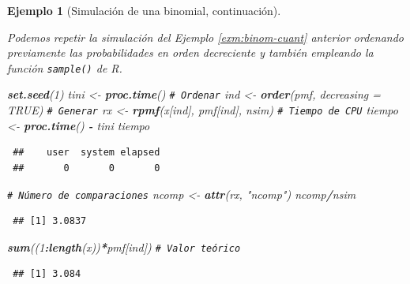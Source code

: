 \documentclass[
  spanish,
  10pt,
]{book}
\newenvironment{Shaded}{\begin{snugshade}}{\end{snugshade}}
\newcommand{\AttributeTok}[1]{\textcolor[rgb]{0.13,0.29,0.53}{#1}}
\newcommand{\CommentTok}[1]{\textcolor[rgb]{0.56,0.35,0.01}{\textit{#1}}}
\newcommand{\ConstantTok}[1]{\textcolor[rgb]{0.56,0.35,0.01}{#1}}
\newcommand{\DecValTok}[1]{\textcolor[rgb]{0.00,0.00,0.81}{#1}}
\newcommand{\FunctionTok}[1]{\textcolor[rgb]{0.13,0.29,0.53}{\textbf{#1}}}
\newcommand{\NormalTok}[1]{#1}
\newcommand{\OtherTok}[1]{\textcolor[rgb]{0.56,0.35,0.01}{#1}}
\newcommand{\SpecialCharTok}[1]{\textcolor[rgb]{0.81,0.36,0.00}{\textbf{#1}}}
\newcommand{\StringTok}[1]{\textcolor[rgb]{0.31,0.60,0.02}{#1}}
\theoremstyle{break}
\newtheorem{example}{Ejemplo}[chapter]
\theoremstyle{nonumberplain}
\renewcommand{\CommentTok}[1]{\textcolor[rgb]{0.41,0.41,0.41}{\texttt{#1}}}
\begin{document}
\begin{example}[Simulación de una binomial, continuación]
\protect\hypertarget{exm:binom-cuantb}{}\label{exm:binom-cuantb}

Podemos repetir la simulación del Ejemplo \ref{exm:binom-cuant} anterior ordenando previamente las probabilidades en orden decreciente y también empleando la función \texttt{sample()} de R.

\begin{Shaded}
\begin{Highlighting}[]
\FunctionTok{set.seed}\NormalTok{(}\DecValTok{1}\NormalTok{)}
\NormalTok{tini }\OtherTok{\textless{}{-}} \FunctionTok{proc.time}\NormalTok{()}
\CommentTok{\# Ordenar}
\NormalTok{ind }\OtherTok{\textless{}{-}} \FunctionTok{order}\NormalTok{(pmf, }\AttributeTok{decreasing =} \ConstantTok{TRUE}\NormalTok{)}
\CommentTok{\# Generar}
\NormalTok{rx }\OtherTok{\textless{}{-}} \FunctionTok{rpmf}\NormalTok{(x[ind], pmf[ind], nsim)}
\CommentTok{\# Tiempo de CPU}
\NormalTok{tiempo }\OtherTok{\textless{}{-}} \FunctionTok{proc.time}\NormalTok{() }\SpecialCharTok{{-}}\NormalTok{ tini}
\NormalTok{tiempo}
\end{Highlighting}
\end{Shaded}

\begin{verbatim}
 ##    user  system elapsed 
 ##       0       0       0
\end{verbatim}

\begin{Shaded}
\begin{Highlighting}[]
\CommentTok{\# Número de comparaciones}
\NormalTok{ncomp }\OtherTok{\textless{}{-}} \FunctionTok{attr}\NormalTok{(rx, }\StringTok{"ncomp"}\NormalTok{)}
\NormalTok{ncomp}\SpecialCharTok{/}\NormalTok{nsim}
\end{Highlighting}
\end{Shaded}

\begin{verbatim}
 ## [1] 3.0837
\end{verbatim}

\begin{Shaded}
\begin{Highlighting}[]
\FunctionTok{sum}\NormalTok{((}\DecValTok{1}\SpecialCharTok{:}\FunctionTok{length}\NormalTok{(x))}\SpecialCharTok{*}\NormalTok{pmf[ind]) }\CommentTok{\# Valor teórico}
\end{Highlighting}
\end{Shaded}

\begin{verbatim}
 ## [1] 3.084
\end{verbatim}


\end{example}
\end{document}
